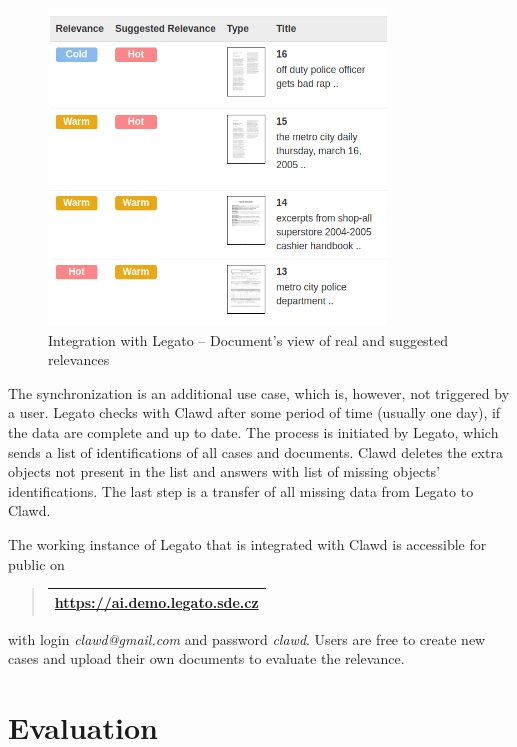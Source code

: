 \documentclass[
  digital, %
  notable,   %
  nolof,     %
  nolot,     %
]{fithesis3}
\begin{document}
\begin{figure}[h]
\caption{Integration with Legato -- Document's view of real and suggested relevances}
\label{fig:integration_documentsview}
\includegraphics[width=0.8\textwidth]{img/integration_documentsview}
\end{figure}

The synchronization is an additional use case, which is, however, not triggered by a user.
Legato checks with Clawd after some period of time (usually one day), if the data are complete and up to date.
The process is initiated by Legato, which sends a list of identifications of all cases and documents.
Clawd deletes the extra objects not present in the list and answers with list of missing objects' identifications.
The last step is a transfer of all missing data from Legato to Clawd.

The working instance of Legato that is integrated with Clawd is accessible for public on 
\begin{quote}
\begin{tabularx}{10.45cm}{|>{\centering\arraybackslash} m{10cm}|}
\hline
\vspace{2mm}
\url{https://ai.demo.legato.sde.cz}
\vspace{2mm} \\
\hline
\end{tabularx}
\end{quote}
with login \textit{clawd@gmail.com} and password \textit{clawd}.
Users are free to create new cases and upload their own documents to evaluate the relevance.


\chapter{Evaluation}
\label{chp:evaluation}
\end{document}
